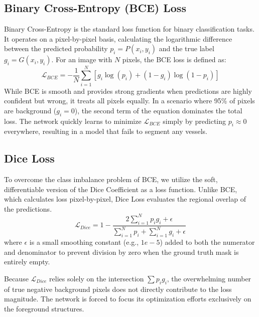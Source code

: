 \subsection{Binary Cross-Entropy (BCE) Loss}
Binary Cross-Entropy is the standard loss function for binary classification tasks. It operates on a pixel-by-pixel basis, calculating the logarithmic difference between the predicted probability $p_i = P(x_i, y_i)$ and the true label $g_i = G(x_i, y_i)$. For an image with $N$ pixels, the BCE loss is defined as:
\begin{equation}
    \mathcal{L}_{BCE} = - \frac{1}{N} \sum_{i=1}^{N} \left[ g_i \log(p_i) + (1 - g_i) \log(1 - p_i) \right]
\end{equation}
While BCE is smooth and provides strong gradients when predictions are highly confident but wrong, it treats all pixels equally. In a scenario where 95\% of pixels are background ($g_i = 0$), the second term of the equation dominates the total loss. The network quickly learns to minimize $\mathcal{L}_{BCE}$ simply by predicting $p_i \approx 0$ everywhere, resulting in a model that fails to segment any vessels.

\subsection{Dice Loss}
To overcome the class imbalance problem of BCE, we utilize the soft, differentiable version of the Dice Coefficient as a loss function. Unlike BCE, which calculates loss pixel-by-pixel, Dice Loss evaluates the regional overlap of the predictions.
\begin{equation}
    \mathcal{L}_{Dice} = 1 - \frac{2 \sum_{i=1}^{N} p_i g_i + \epsilon}{\sum_{i=1}^{N} p_i + \sum_{i=1}^{N} g_i + \epsilon}
\end{equation}
where $\epsilon$ is a small smoothing constant (e.g., $1e-5$) added to both the numerator and denominator to prevent division by zero when the ground truth mask is entirely empty.

Because $\mathcal{L}_{Dice}$ relies solely on the intersection $\sum p_i g_i$, the overwhelming number of true negative background pixels does not directly contribute to the loss magnitude. The network is forced to focus its optimization efforts exclusively on the foreground structures.

